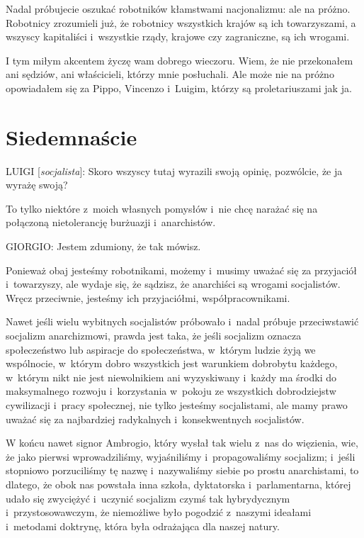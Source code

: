 \documentclass[oneside,polish,11pt,sfheadings]{mwbk}
\begin{document}
 
Nadal próbujecie oszukać robotników kłamstwami nacjonalizmu: ale na próżno. Robotnicy zrozumieli już, że robotnicy
wszystkich krajów są ich towarzyszami, a wszyscy kapitaliści i~wszystkie rządy, krajowe czy zagraniczne, są ich
wrogami. 

 
I tym miłym akcentem życzę wam dobrego wieczoru. Wiem, że nie przekonałem ani sędziów, ani właścicieli, którzy mnie
posłuchali. Ale może nie na próżno opowiadałem się za Pippo, Vincenzo i~Luigim, którzy są proletariuszami jak ja. 


\chapter*{Siedemnaście}



 
\noindent LUIGI [\textit{socjalista}]: Skoro wszyscy tutaj wyrazili swoją opinię, pozwólcie, że ja wyrażę swoją? 

 
To tylko niektóre z~moich własnych pomysłów i~nie chcę narażać się na połączoną nietolerancję burżuazji i~anarchistów. 




 
\noindent GIORGIO: Jestem zdumiony, że tak mówisz. 

 
Ponieważ obaj jesteśmy robotnikami, możemy i~musimy uważać się za przyjaciół i~towarzyszy, ale wydaje się, że sądzisz,
że anarchiści są wrogami socjalistów. Wręcz przeciwnie, jesteśmy ich przyjaciółmi, współpracownikami. 

 
Nawet jeśli wielu wybitnych socjalistów próbowało i~nadal próbuje przeciwstawić socjalizm anarchizmowi, prawda jest
taka, że  jeśli socjalizm oznacza społeczeństwo lub aspiracje do społeczeństwa, w~którym ludzie żyją we
wspólnocie, w~którym dobro wszystkich jest warunkiem dobrobytu każdego, w~którym nikt nie jest niewolnikiem ani
wyzyskiwany i~każdy ma środki do maksymalnego rozwoju i~korzystania w~pokoju ze wszystkich dobrodziejstw cywilizacji i~pracy społecznej, nie tylko jesteśmy socjalistami, ale mamy prawo uważać się za najbardziej radykalnych i~konsekwentnych socjalistów. 

 
W końcu nawet signor Ambrogio, który wysłał tak wielu z~nas do więzienia, wie, że jako pierwsi wprowadziliśmy,
wyjaśniliśmy i~propagowaliśmy socjalizm; i~jeśli stopniowo porzuciliśmy tę nazwę i~nazywaliśmy siebie po prostu
anarchistami, to dlatego, że obok nas powstała inna szkoła, dyktatorska i~parlamentarna, której udało się zwyciężyć i~uczynić socjalizm czymś tak hybrydycznym i~przystosowawczym, że niemożliwe było pogodzić z~naszymi ideałami i~metodami
doktrynę, która była odrażająca dla naszej natury. 
\end{document}
